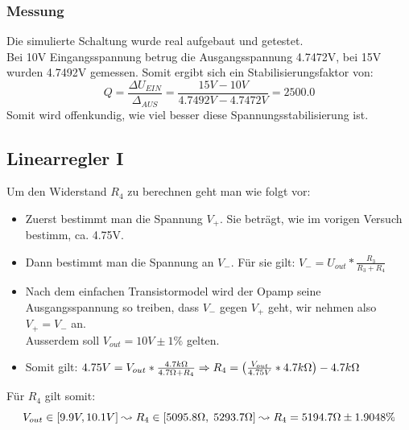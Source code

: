 \subsubsection*{Messung}
Die simulierte Schaltung wurde real aufgebaut und getestet.\\
Bei 10V Eingangsspannung betrug die Ausgangsspannung 4.7472V, bei 15V wurden 4.7492V gemessen. Somit ergibt sich ein Stabilisierungsfaktor von:
\[ Q=\frac{\Delta U_{EIN}}{\Delta_{AUS}} = \frac{15V-10V}{4.7492V-4.7472V}=2500.0 \]
Somit wird offenkundig, wie viel besser diese Spannungsstabilisierung ist.

\subsection{Linearregler I}
Um den Widerstand $ R_4 $ zu berechnen geht man wie folgt vor:
\begin{itemize}
	\item Zuerst bestimmt man die Spannung $ V_+ $. Sie beträgt, wie im vorigen Versuch bestimm, ca. 4.75V.
	\item Dann bestimmt man die Spannung an $ V_- $. Für sie gilt: $ V_- = U_{out} * \frac{R_3}{R_3+R_4} $

	\item Nach dem einfachen Transistormodel wird der Opamp seine Ausgangsspannung so treiben, dass $ V_- $ gegen $ V_+ $ geht, wir nehmen also $ V_+ = V_- $ an.\\Ausserdem soll $ V_{out} = 10V \pm 1\% $ gelten.

	\item Somit gilt: $ 4.75V = V_{out} * \frac{4.7k\Omega}{4.7\Omega+R_4} \Rightarrow R_4 = \left( \frac{V_{out}}{4.75V} *4.7k\Omega \right) -4.7k\Omega$
\end{itemize}

Für $ R_4 $ gilt somit: \[ V_{out} \in \left[ 9.9V , 10.1V \right]  \leadsto R_4 \in \left[ 5095.8\Omega,\; 5293.7\Omega \right] \leadsto R_4 = 5194.7\Omega \pm 1.9048 \% \]

